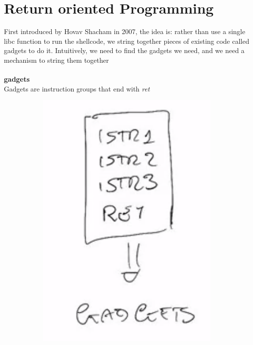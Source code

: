 \documentclass[11pt, oneside]{article}   	%
\begin{document}
\section*{Return oriented Programming}
First introduced by Hovav Shacham in 2007, the idea is: rather than use a single libc function to run the shellcode, we string together pieces of existing code called gadgets to do it. Intuitively, we need to find the gadgets we need, and we need a mechanism to string them together\\\\
\textbf{gadgets}\\
Gadgets are instruction groups that end with \emph{ret}
\begin{figure}[H]
\begin{subfigure}[H]{0.2\linewidth}
\includegraphics[width=\linewidth]{gadget}
\end{subfigure}

\end{figure}
\end{document}
